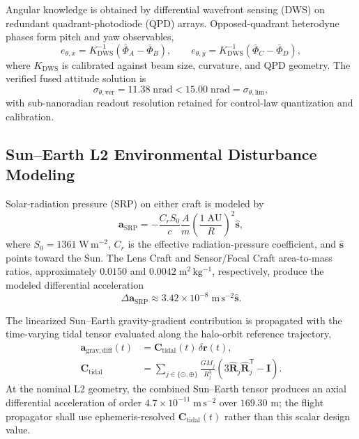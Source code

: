 \documentclass[10pt,twocolumn]{IEEEtran}
\begin{document}
Angular knowledge is obtained by differential wavefront sensing (DWS) on redundant quadrant-photodiode (QPD) arrays.  Opposed-quadrant heterodyne phases form pitch and yaw observables,
\begin{equation}
e_{\theta,x}=K_{\mathrm{DWS}}^{-1}(\bar\Phi_A-\bar\Phi_B),
\qquad
e_{\theta,y}=K_{\mathrm{DWS}}^{-1}(\bar\Phi_C-\bar\Phi_D),
\label{eq:dws_observables}
\end{equation}
where $K_{\mathrm{DWS}}$ is calibrated against beam size, curvature, and QPD geometry.  The verified fused attitude solution is
\begin{equation}
\sigma_{\theta,\mathrm{ver}}=11.38\;\mathrm{nrad}
<15.00\;\mathrm{nrad}=\sigma_{\theta,\mathrm{lim}},
\label{eq:verified_dws_attitude}
\end{equation}
with sub-nanoradian readout resolution retained for control-law quantization and calibration.

\subsection{Sun--Earth L2 Environmental Disturbance Modeling}
\label{sec:l2_disturbances}

Solar-radiation pressure (SRP) on either craft is modeled by
\begin{equation}
\bm a_{\mathrm{SRP}}
=-\frac{C_rS_0}{c}\frac{A}{m}
\left(\frac{1\;\mathrm{AU}}{R}\right)^2\widehat{\bm s},
\label{eq:srp_model}
\end{equation}
where $S_0=1361\;\mathrm{W\,m^{-2}}$, $C_r$ is the effective radiation-pressure coefficient, and $\widehat{\bm s}$ points toward the Sun.  The Lens Craft and Sensor/Focal Craft area-to-mass ratios, approximately $0.0150$ and $0.0042\;\mathrm{m^2\,kg^{-1}}$, respectively, produce the modeled differential acceleration
\begin{equation}
\Delta\bm a_{\mathrm{SRP}}
\approx3.42\times10^{-8}\;\mathrm{m\,s^{-2}}\widehat{\bm s}.
\label{eq:differential_srp}
\end{equation}

The linearized Sun--Earth gravity-gradient contribution is propagated with the time-varying tidal tensor evaluated along the halo-orbit reference trajectory,
\begin{equation}
\begin{aligned}
\bm a_{\mathrm{grav,diff}}(t)
&=\bm C_{\mathrm{tidal}}(t)\,\delta\bm r(t),\\
\bm C_{\mathrm{tidal}}
&=\sum_{j\in\{\odot,\oplus\}}\frac{GM_j}{R_j^3}
\left(3\widehat{\bm R}_j\widehat{\bm R}_j^{\mathsf T}-\bm I\right).
\end{aligned}
\label{eq:tidal_tensor}
\end{equation}
At the nominal L2 geometry, the combined Sun--Earth tensor produces an axial differential acceleration of order $4.7\times10^{-11}\;\mathrm{m\,s^{-2}}$ over $169.30$ m; the flight propagator shall use ephemeris-resolved $\bm C_{\mathrm{tidal}}(t)$ rather than this scalar design value.
\end{document}
